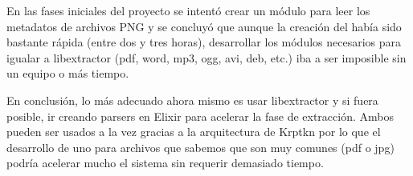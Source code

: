 En las fases iniciales del proyecto se intentó crear un módulo para leer los metadatos de archivos PNG y se concluyó que aunque la creación del  había sido bastante rápida (entre dos y tres horas), desarrollar los módulos necesarios para igualar a libextractor (pdf, word, mp3, ogg, avi, deb, etc.) iba a ser imposible sin un equipo o más tiempo.

En conclusión, lo más adecuado ahora mismo es usar libextractor y si fuera posible, ir creando parsers en Elixir para acelerar la fase de extracción. Ambos pueden ser usados a la vez gracias a la arquitectura de Krptkn por lo que el desarrollo de uno para archivos que sabemos que son muy comunes (pdf o jpg) podría acelerar mucho el sistema sin requerir demasiado tiempo.
